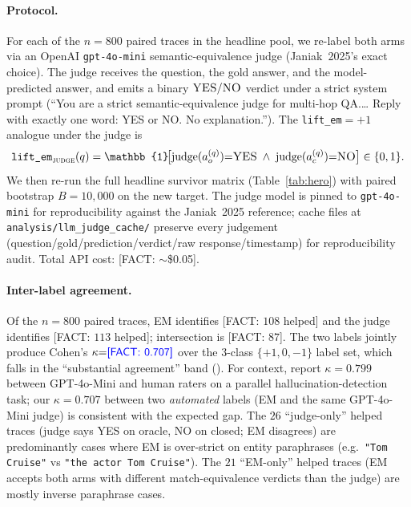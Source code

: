 \documentclass[11pt]{article}
\newcommand{\FACT}[1]{{\color{blue}\textsf{[FACT: #1]}}}
\begin{document}
\paragraph{Protocol.} For each of the $n{=}800$ paired traces in the
headline pool, we re-label both arms via an OpenAI \texttt{gpt-4o-mini}
semantic-equivalence judge (Janiak~2025's exact choice). The judge receives
the question, the gold answer, and the model-predicted answer, and emits a
binary $\textsc{YES}/\textsc{NO}$ verdict under a strict system prompt
(``You are a strict semantic-equivalence judge for multi-hop QA.\ldots
Reply with exactly one word: YES or NO. No explanation.''). The
\texttt{lift\_em}$=+1$ analogue under the judge is
\begin{equation}
\texttt{lift\_em}_{\textsc{judge}}(q) =
\mathbb{1}\!\bigl[\mathrm{judge}(a_o^{(q)}){=}\textsc{YES} \;\wedge\;
\mathrm{judge}(a_c^{(q)}){=}\textsc{NO}\bigr] \in \{0, 1\}.
\label{eq:lift-em-judge}
\end{equation}
We then re-run the full headline survivor matrix
(Table~\ref{tab:hero}) with paired bootstrap $B{=}10{,}000$ on the new
target. The judge model is pinned to \texttt{gpt-4o-mini} for
reproducibility against the Janiak~2025 reference; cache files at
\texttt{analysis/llm\_judge\_cache/} preserve every judgement
(question/gold/prediction/verdict/raw response/timestamp) for
reproducibility audit. Total API cost: \FACT{$\sim$\$0.05}.

\paragraph{Inter-label agreement.}
Of the $n{=}800$ paired traces, EM identifies \FACT{$108$ helped} and the
judge identifies \FACT{$113$ helped}; intersection is \FACT{$87$}. The two
labels jointly produce Cohen's $\kappa{=}\FACT{0.707}$ over the 3-class
$\{+1, 0, -1\}$ label set, which falls in the ``substantial agreement''
band (\citealp{LandisKoch_Kappa}). For context,
\citet{Janiak_IllusionProgressHallucinationDetection} report
$\kappa{=}0.799$ between GPT-4o-Mini and human raters on a parallel
hallucination-detection task; our $\kappa{=}0.707$ between two
\emph{automated} labels (EM and the same GPT-4o-Mini judge) is consistent
with the expected gap. The $26$ ``judge-only'' helped traces (judge says
YES on oracle, NO on closed; EM disagrees) are predominantly cases where
EM is over-strict on entity paraphrases (e.g.\ \texttt{"Tom Cruise"} vs
\texttt{"the actor Tom Cruise"}). The $21$ ``EM-only'' helped traces
(EM accepts both arms with different match-equivalence verdicts than the
judge) are mostly inverse paraphrase cases.
\end{document}
